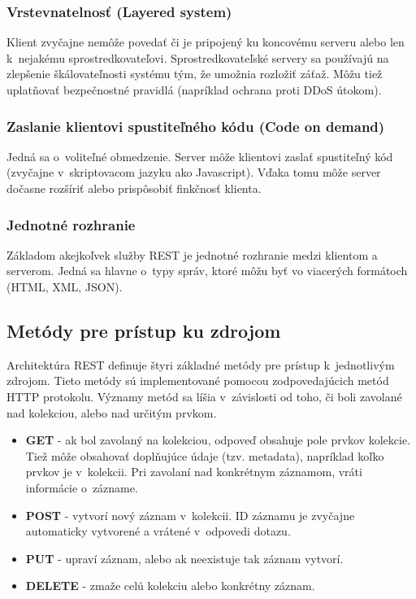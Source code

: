 \documentclass[../projekt.tex]{subfiles}
\begin{document}
\subsubsection{Vrstevnatelnosť (Layered system)}
Klient zvyčajne nemôže povedať či je pripojený ku koncovému serveru alebo len k~nejakému sprostredkovateľovi. Sprostredkovateľské servery sa používajú na zlepšenie škálovateľnosti systému tým, že umožnia rozložiť záťaž. Môžu tiež uplatňovať bezpečnostné pravidlá (napríklad ochrana proti DDoS útokom).

\subsubsection{Zaslanie klientovi spustiteľného kódu (Code on demand)}
Jedná sa o~voliteľné obmedzenie. Server môže klientovi zaslať spustiteľný kód (zvyčajne v~skriptovacom jazyku ako Javascript). Vďaka tomu môže server dočasne rozšíriť alebo prispôsobiť finkčnosť klienta.

\subsubsection{Jednotné rozhranie}
Základom akejkoľvek služby REST je jednotné rozhranie medzi klientom a serverom. Jedná sa hlavne o~typy správ, ktoré môžu byť vo viacerých formátoch (HTML, XML, JSON).

\subsection{Metódy pre prístup ku zdrojom}
Architektúra REST definuje štyri základné metódy pre prístup k~jednotlivým zdrojom. Tieto metódy sú implementované pomocou zodpovedajúcich metód HTTP protokolu. Významy metód sa líšia v~závislosti od toho, či boli zavolané nad kolekciou, alebo nad určitým prvkom.
\begin{itemize}
    \item \textbf{GET} - ak bol zavolaný na kolekciou, odpoveď obsahuje pole prvkov kolekcie. Tiež môže obsahovať doplňujúce údaje (tzv. metadata), napríklad koľko prvkov je v~kolekcii.
    Pri zavolaní nad konkrétnym záznamom, vráti informácie o~zázname.
    \item \textbf{POST} - vytvorí nový záznam v~kolekcii. ID záznamu je zvyčajne automaticky vytvorené a vrátené v~odpovedi dotazu.
    \item \textbf{PUT} - upraví záznam, alebo ak neexistuje tak záznam vytvorí.
    \item \textbf{DELETE} - zmaže celú kolekciu alebo konkrétny záznam.
\end{itemize}
\end{document}
